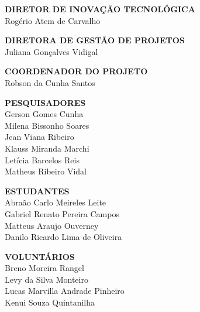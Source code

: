 \begin{center}
    \textbf{DIRETOR DE INOVAÇÃO TECNOLÓGICA}\\
    Rogério Atem de Carvalho
    \vfill
    
    \textbf{DIRETORA DE GESTÃO DE PROJETOS}\\
    Juliana Gonçalves Vidigal
    \vfill
    
    \textbf{COORDENADOR DO PROJETO}\\
    Robson da Cunha Santos
    \vfill
    
    \textbf{PESQUISADORES}\\
    Gerson Gomes Cunha\\
    Milena Bissonho Soares\\
    Jean Viana Ribeiro \\
    Klauss Miranda Marchi \\
    Letícia Barcelos Reis \\
    Matheus Ribeiro Vidal
    \vfill
    
    \textbf{ESTUDANTES}\\
    Abraão Carlo Meireles Leite\\
    Gabriel Renato Pereira Campos\\
    Matteus Araujo Ouverney\\
    Danilo Ricardo Lima de Oliveira
    \vfill

    \textbf{VOLUNTÁRIOS}\\
    Breno Moreira Rangel\\
    Levy da Silva Monteiro\\
    Lucas Marvilla Andrade Pinheiro\\
    Kenui Souza Quintanilha
    \vfill
\end{center}